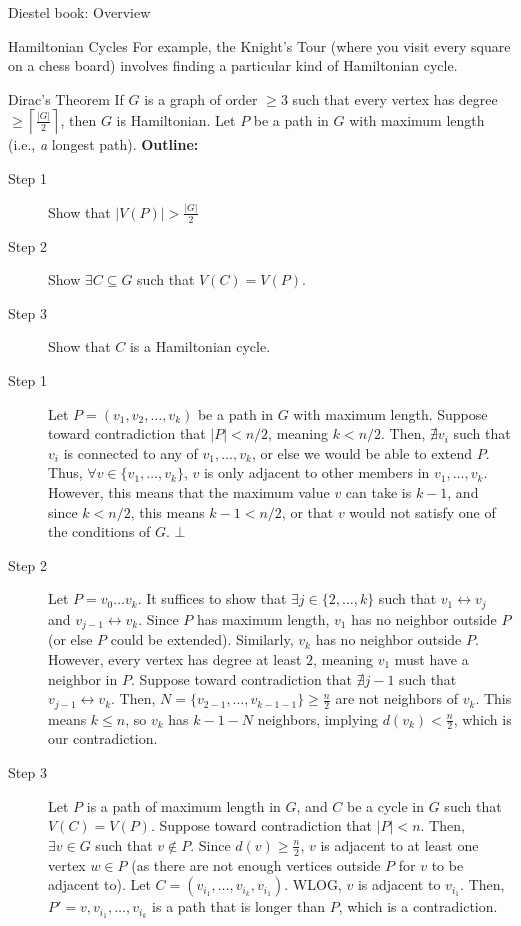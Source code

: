 \documentclass[10pt]{extarticle}
\begin{document}
{\begin{problem}{Diestel book: Overview}
\begin{problem}{Hamiltonian Cycles}
      For example, the Knight's Tour (where you visit every square on a chess board) involves finding a particular kind of Hamiltonian cycle. 
    \end{problem}
    \begin{problem}{Dirac's Theorem}
      If $G$ is a graph of order $\geq 3$ such that every vertex has degree $\geq \left\lceil\frac{|G|}{2}\right\rceil$, then $G$ is Hamiltonian.
      \tcblower
      Let $P$ be a path in $G$ with maximum length (i.e., \textit{a} longest path).
      \textbf{Outline:}
      \begin{description}
        \item[Step 1] Show that $|V(P)| > \frac{|G|}{2}$
        \item[Step 2] Show $\exists C\subseteq G$ such that $V(C) = V(P)$.
        \item[Step 3] Show that $C$ is a Hamiltonian cycle.
      \end{description}
      \begin{description}
        \item[Step 1] Let $P = (v_1,v_2,\dots,v_k)$ be a path in $G$ with maximum length. Suppose toward contradiction that $|P| < n/2$, meaning $k< n/2$. Then, $\nexists v_i$ such that $v_i$ is connected to any of $v_1,\dots,v_k$, or else we would be able to extend $P$. Thus, $\forall v\in \{v_1,\dots,v_k\}$, $v$ is only adjacent to other members in $v_1,\dots,v_k$. However, this means that the maximum value $v$ can take is $k-1$, and since $k < n/2$, this means $k-1 < n/2$, or that $v$ would not satisfy one of the conditions of $G$. $\bot$
        \item[Step 2] Let $P=v_0\dots v_k$. It suffices to show that $\exists j\in \{2,\dots,k\}$ such that $v_1\leftrightarrow v_j$ and $v_{j-1} \leftrightarrow v_k$. Since $P$ has maximum length, $v_1$ has no neighbor outside $P$ (or else $P$ could be extended). Similarly, $v_k$ has no neighbor outside $P$. However, every vertex has degree at least $2$, meaning $v_1$ must have a neighbor in $P$. Suppose toward contradiction that $\nexists j-1$ such that $v_{j-1} \leftrightarrow v_k$. Then, $N = \{v_{2-1},\dots,v_{k-1-1}\}\geq \frac{n}{2}$ are not neighbors of $v_k$. This means $k\leq n$, so $v_k$ has $k-1-N$ neighbors, implying $d(v_k) < \frac{n}{2}$, which is our contradiction.
        \item[Step 3] Let $P$ is a path of maximum length in $G$, and $C$ be a cycle in $G$ such that $V(C) = V(P)$. Suppose toward contradiction that $|P| < n$. Then, $\exists v\in G$ such that $v\notin P$. Since $d(v) \geq \frac{n}{2}$, $v$ is adjacent to at least one vertex $w\in P$ (as there are not enough vertices outside $P$ for $v$ to be adjacent to). Let $C = (v_{i_1},\dots,v_{i_k},v_{i_1})$. WLOG, $v$ is adjacent to $v_{i_1}$. Then, $P' = v,v_{i_1},\dots,v_{i_k}$ is a path that is longer than $P$, which is a contradiction.

\end{description}
\end{problem}
\end{problem}}
\end{document}
